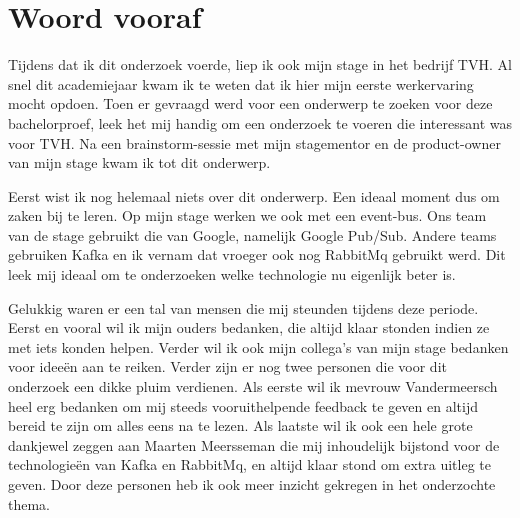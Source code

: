 
\chapter*{Woord vooraf}
\label{ch:voorwoord}


Tijdens dat ik dit onderzoek voerde, liep ik ook mijn stage in het bedrijf TVH. Al snel dit academiejaar kwam ik te weten dat ik hier mijn eerste werkervaring mocht opdoen. Toen er gevraagd werd voor een onderwerp te zoeken voor deze bachelorproef, leek het mij handig om een onderzoek te voeren die interessant was voor TVH. Na een brainstorm-sessie met mijn stagementor en de product-owner van mijn stage kwam ik tot dit onderwerp. 

Eerst wist ik nog helemaal niets over dit onderwerp. Een ideaal moment dus om zaken bij te leren. Op mijn stage werken we ook met een event-bus. Ons team van de stage gebruikt die van Google, namelijk Google Pub/Sub. Andere teams gebruiken Kafka en ik vernam dat vroeger ook nog RabbitMq gebruikt werd. Dit leek mij ideaal om te onderzoeken welke technologie nu eigenlijk beter is.

Gelukkig waren er een tal van mensen die mij steunden tijdens deze periode. Eerst en vooral wil ik mijn ouders bedanken, die altijd klaar stonden indien ze met iets konden helpen. Verder wil ik ook mijn collega's van mijn stage bedanken voor ideeën aan te reiken. Verder zijn er nog twee personen die voor dit onderzoek een dikke pluim verdienen. Als eerste wil ik mevrouw Vandermeersch heel erg bedanken om mij steeds vooruithelpende feedback te geven en altijd bereid te zijn om alles eens na te lezen. Als laatste wil ik ook een hele grote dankjewel zeggen aan Maarten Meersseman die mij inhoudelijk bijstond voor de technologieën van Kafka en RabbitMq, en altijd klaar stond om extra uitleg te geven. Door deze personen heb ik ook meer inzicht gekregen in het onderzochte thema.
